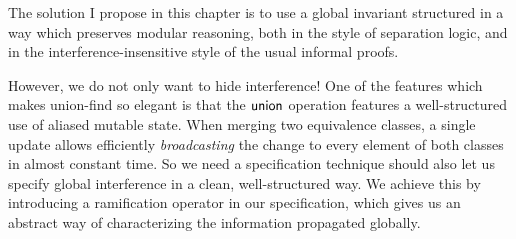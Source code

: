 The solution I propose in this chapter is to use a global invariant
structured in a way which preserves modular reasoning, both in the
style of separation logic, and in the interference-insensitive style
of the usual informal proofs. 

However, we do not only want to hide interference! One of the features
which makes union-find so elegant is that the $\mathsf{union}$ operation
features a well-structured use of aliased mutable state.  When merging
two equivalence classes, a single update allows efficiently
\emph{broadcasting} the change to every element of both classes in
almost constant time.  So we need a specification technique should also
let us specify global interference in a clean, well-structured way. We
achieve this by introducing a ramification operator in our
specification, which gives us an abstract way of characterizing the
information propagated globally.


